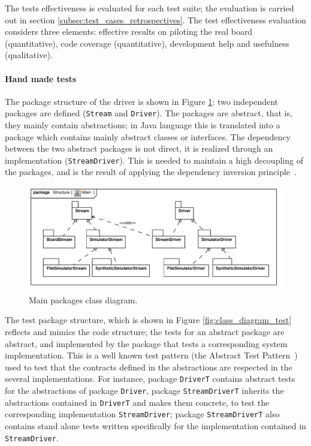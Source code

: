 \documentclass[english]{lni}
\newcommand{\lil}[1]{\texttt{\lstinline|#1|}}
\begin{document}
The tests effectiveness is evaluated for each test suite; the evaluation is carried out in section \ref{subsec:test_cases_retrospectives}.
The test effectiveness evaluation considers three elements: effective results on piloting the real board (quantitative), code coverage
(quantitative), development help and usefulness (qualitative).

\paragraph*{Hand made tests}

The package structure of the driver is shown in Figure \ref{fig:class_diagram_main}: two independent packages are defined (\lil{Stream} and \lil{Driver}).  
The packages are abstract, that is, they mainly contain abstractions; in Java language this is translated into a package which contains mainly abstract classes or interfaces.  
The dependency between the two abstract packages is not direct, it is realized through an implementation (\lil{StreamDriver}).
This is needed to maintain a high decoupling of the packages, and is the result of applying the dependency inversion principle~\cite{Martin1996}.

\begin{figure}[htb!]
  \centering
  \includegraphics[scale=0.7]{UML_model/Class_Diagram__Structure__Main}
  \caption{Main packages class diagram.}
  \label{fig:class_diagram_main}
\end{figure}

The test package structure, which is shown in Figure \ref{fig:class_diagram_test} reflects and mimics the code structure; the tests for an abstract package are abstract, and implemented by the package that tests a corresponding system implementation. 
This is a well known test pattern (the Abstract Test Pattern~\cite{Thomas2004}) used to test that the contracts defined in the abstractions are respected in the several implementations.  
For instance, package \lil{DriverT} contains abstract tests for the abstractions of package \lil{Driver}, package \lil{StreamDriverT} inherits the abstractions contained in \lil{DriverT} and makes them concrete, to test the corresponding implementation \lil{StreamDriver}; package \lil{StreamDriverT} also contains stand alone tests written specifically for the implementation contained in \lil{StreamDriver}.
\end{document}
